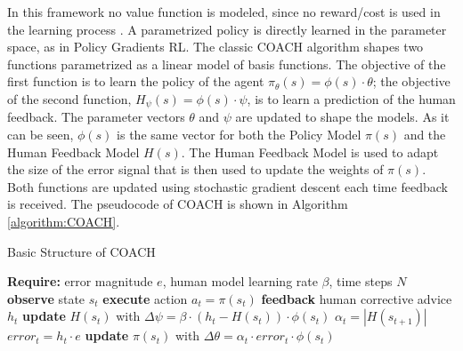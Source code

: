 In this framework no value function is modeled, since no reward/cost is used in the learning process \cite{Celemin2018AnInteractive}. A parametrized policy is directly learned in the parameter space, as in Policy Gradients RL. 
The classic COACH algorithm shapes two functions parametrized as a linear model of basis functions. The objective of the first function is to learn the policy of the agent $\pi_{\theta}(s)=\phi(s) \cdot \theta$; the objective of the second function, $H_{\psi}(s)=\phi(s) \cdot \psi$, is to learn a prediction of the human feedback. The parameter vectors $\theta$ and $\psi$ are updated to shape the models. As it can be seen, $\phi(s)$ is the same vector for both the Policy Model $\pi(s)$ and the Human Feedback Model  $H(s)$. The Human Feedback Model is used to adapt the size of the error signal that is then used to update the weights of $\pi(s)$. Both functions are updated using stochastic gradient descent each time feedback is received. The pseudocode of COACH is shown in Algorithm \ref{algorithm:COACH}.

\begin{algorithm}[H]
\caption{Basic Structure of COACH}\label{algorithm:COACH}
\begin{algorithmic}[1]
\State \textbf{Require:} error magnitude $e$, human model learning rate $\beta$, time steps $N$
\State \textbf{observe} state $s_{t}$
\State \textbf{execute} action $a_{t}=\pi(s_{t})$
\State \textbf{feedback} human corrective advice $h_{t}$
\State \textbf{update} $H(s_{t})$ with $\Delta \psi = \beta\cdot (h_{t}-H(s_{t}))\cdot \phi(s_{t})$
\State $\alpha_{t} = |H(s_{t+1})|$
\State $error_{t} = h_{t}\cdot e$
\State \textbf{update} $\pi(s_{t})$ with $\Delta \theta = \alpha_{t} \cdot error_{t} \cdot \phi(s_{t})$
\EndIf
\EndFor
\end{algorithmic}
\end{algorithm}